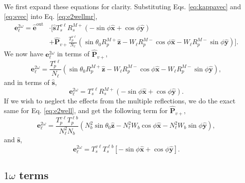 We first expand these equations for clarity. Substituting Eqs.
\eqref{eq:kappavec} and \eqref{eq:svec} into Eq. \eqref{eq:e2wellmr},
\begin{equation*}\label{eq:e2wexpmr}
\begin{split}
\mathbf{e}^{2\omega}_{\ell} = \hat{\mathbf{e}}^{\mathrm{out}}&\cdot
\Bigg[
\hat{\mathbf{s}}T_{s}^{v\ell}R^{M+}_{s}
\left(
- \sin\phi\hat{\mathbf{x}}
+ \cos\phi\hat{\mathbf{y}}
\right)\\
&+ \hat{\mathbf{P}}_{v+}\frac{T^{v\ell}_{p}}{N_{\ell}}
\left(
  \sin\theta_{0}R^{M+}_{p}\hat{\mathbf{z}}
- W_{\ell}R^{M-}_{p}\cos\phi\hat{\mathbf{x}}
- W_{\ell}R^{M-}_{p}\sin\phi\hat{\mathbf{y}}
\right)
\Bigg].
\end{split}
\end{equation*}
We now have $\mathbf{e}^{2\omega}_{\ell}$ in terms of
$\hat{\mathbf{P}}_{v+}$,
\begin{equation}\label{eq:e2wpmr}
\mathbf{e}^{2\omega}_{\ell} =
\frac{T^{v\ell}_{p}}{N_{\ell}}
\left(
  \sin\theta_{0}R^{M+}_{p}\hat{\mathbf{z}}
- W_{\ell}R^{M-}_{p}\cos\phi\hat{\mathbf{x}}
- W_{\ell}R^{M-}_{p}\sin\phi\hat{\mathbf{y}}
\right),
\end{equation}
and in terms of $\hat{\mathbf{s}}$,
\begin{equation}\label{eq:e2wsmr}
\mathbf{e}^{2\omega}_{\ell} =
T_{s}^{v\ell}R^{M+}_{s}
\left(
- \sin\phi\hat{\mathbf{x}}
+ \cos\phi\hat{\mathbf{y}}
\right).
\end{equation}
If we wish to neglect the effects from the multiple reflections, we do the exact
same for Eq. \eqref{eq:e2well}, and get the following term for
$\hat{\mathbf{P}}_{v+}$,
\begin{equation}\label{eq:e2wp}
\mathbf{e}^{2\omega}_{\ell} =
\frac{T^{v\ell}_{p}T^{\ell b}_{p}}
     {N^{2}_{\ell}N_{b}}
\left(
  N^{2}_{b}\sin\theta_{0}\hat{\mathbf{z}}
- N^{2}_{\ell}W_{b}\cos\phi\hat{\mathbf{x}}
- N^{2}_{\ell}W_{b}\sin\phi\hat{\mathbf{y}}
\right),
\end{equation}
and $\hat{\mathbf{s}}$,
\begin{equation}\label{eq:e2ws}
\mathbf{e}^{2\omega}_{\ell} 
= T^{v\ell}_{s}T^{\ell b}_{s}
\left[-\sin\phi\hat{\mathbf{x}} + \cos\phi\hat{\mathbf{y}}\right].
\end{equation}


\subsection{\texorpdfstring{$1\omega$}{1w} terms}

